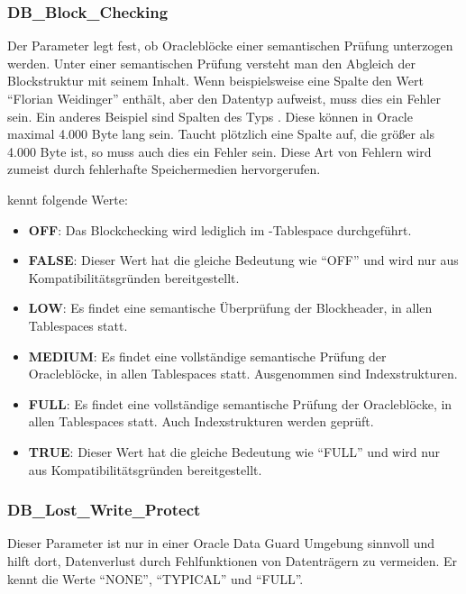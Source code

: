         \subsubsection{DB\_Block\_Checking}
          Der Parameter  legt fest, ob Oracleblöcke einer semantischen Prüfung unterzogen werden. Unter einer semantischen Prüfung versteht man den Abgleich der Blockstruktur mit seinem Inhalt. Wenn beispielsweise eine Spalte den Wert \enquote{Florian Weidinger} enthält, aber den Datentyp  aufweist, muss dies ein Fehler sein. Ein anderes Beispiel sind Spalten des Typs . Diese können in Oracle maximal 4.000 Byte lang sein. Taucht plötzlich eine Spalte auf, die größer als 4.000 Byte ist, so muss auch dies ein Fehler sein. Diese Art von Fehlern wird zumeist durch fehlerhafte Speichermedien hervorgerufen.

           kennt folgende Werte:
          \begin{itemize}
            \item \textbf{OFF}: Das Blockchecking wird lediglich im -Tablespace durchgeführt.
            \item \textbf{FALSE}: Dieser Wert hat die gleiche Bedeutung wie \enquote{OFF} und wird nur aus Kompatibilitätsgründen bereitgestellt.
            \item \textbf{LOW}: Es findet eine semantische Überprüfung der Blockheader, in allen Tablespaces statt.
            \item \textbf{MEDIUM}: Es findet eine vollständige semantische Prüfung der Oracleblöcke, in allen Tablespaces statt. Ausgenommen sind Indexstrukturen.
            \item \textbf{FULL}: Es findet eine vollständige semantische Prüfung der Oracleblöcke, in allen Tablespaces statt. Auch Indexstrukturen werden geprüft.
            \item \textbf{TRUE}: Dieser Wert hat die gleiche Bedeutung wie \enquote{FULL} und wird nur aus Kompatibilitätsgründen bereitgestellt.
          \end{itemize}
        \subsubsection{DB\_Lost\_Write\_Protect}
          Dieser Parameter ist nur in einer Oracle Data Guard Umgebung sinnvoll und hilft dort, Datenverlust durch Fehlfunktionen von Datenträgern zu vermeiden. Er kennt die Werte \enquote{NONE}, \enquote{TYPICAL} und \enquote{FULL}.
